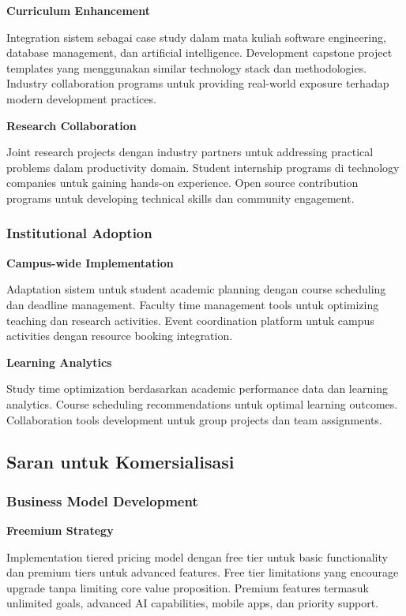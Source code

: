 \textbf{Curriculum Enhancement}

Integration sistem sebagai case study dalam mata kuliah software engineering, database management, dan artificial intelligence. Development capstone project templates yang menggunakan similar technology stack dan methodologies. Industry collaboration programs untuk providing real-world exposure terhadap modern development practices.

\textbf{Research Collaboration}

Joint research projects dengan industry partners untuk addressing practical problems dalam productivity domain. Student internship programs di technology companies untuk gaining hands-on experience. Open source contribution programs untuk developing technical skills dan community engagement.

\subsubsection{Institutional Adoption}

\textbf{Campus-wide Implementation}

Adaptation sistem untuk student academic planning dengan course scheduling dan deadline management. Faculty time management tools untuk optimizing teaching dan research activities. Event coordination platform untuk campus activities dengan resource booking integration.

\textbf{Learning Analytics}

Study time optimization berdasarkan academic performance data dan learning analytics. Course scheduling recommendations untuk optimal learning outcomes. Collaboration tools development untuk group projects dan team assignments.

\subsection{Saran untuk Komersialisasi}

\subsubsection{Business Model Development}

\textbf{Freemium Strategy}

Implementation tiered pricing model dengan free tier untuk basic functionality dan premium tiers untuk advanced features. Free tier limitations yang encourage upgrade tanpa limiting core value proposition. Premium features termasuk unlimited goals, advanced AI capabilities, mobile apps, dan priority support.


